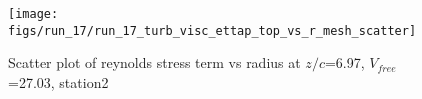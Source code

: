 \begin{figure}[H]
\centering
\texttt{[image: figs/run\_17/run\_17\_turb\_visc\_ettap\_top\_vs\_r\_mesh\_scatter]}
\caption{Scatter plot of reynolds stress term vs radius at $z/c$=6.97, $V_{free}$=27.03, station2}
\label{fig:run_17_turb_visc_ettap_top_vs_r_mesh_scatter}
\end{figure}


